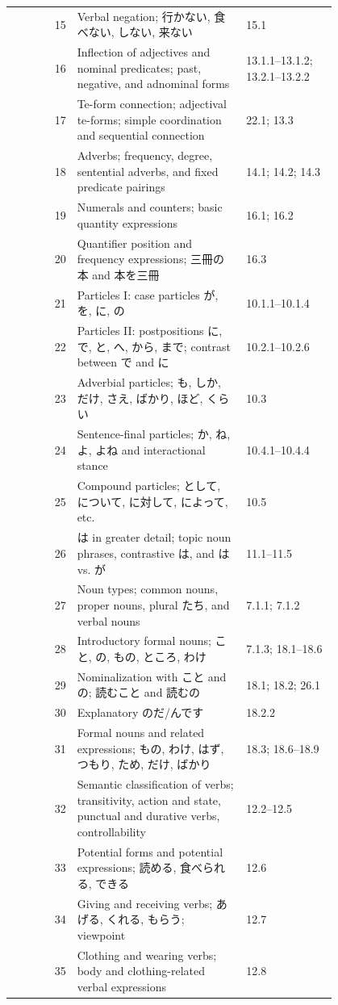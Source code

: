 \documentclass[12pt]{nextbook_zh}
\begin{document}
{\begin{longtable}{r p{0.52\linewidth} p{0.28\linewidth}}
15 & Verbal negation; 行かない, 食べない, しない, 来ない & 15.1 \\
16 & Inflection of adjectives and nominal predicates; past, negative, and adnominal forms & 13.1.1--13.1.2; 13.2.1--13.2.2 \\
17 & Te-form connection; adjectival te-forms; simple coordination and sequential connection & 22.1; 13.3 \\
18 & Adverbs; frequency, degree, sentential adverbs, and fixed predicate pairings & 14.1; 14.2; 14.3 \\
19 & Numerals and counters; basic quantity expressions & 16.1; 16.2 \\
20 & Quantifier position and frequency expressions; 三冊の本 and 本を三冊 & 16.3 \\
21 & Particles I: case particles が, を, に, の & 10.1.1--10.1.4 \\
22 & Particles II: postpositions に, で, と, へ, から, まで; contrast between で and に & 10.2.1--10.2.6 \\
23 & Adverbial particles; も, しか, だけ, さえ, ばかり, ほど, くらい & 10.3 \\
24 & Sentence-final particles; か, ね, よ, よね and interactional stance & 10.4.1--10.4.4 \\
25 & Compound particles; として, について, に対して, によって, etc. & 10.5 \\
26 & は in greater detail; topic noun phrases, contrastive は, and は vs. が & 11.1--11.5 \\
27 & Noun types; common nouns, proper nouns, plural たち, and verbal nouns & 7.1.1; 7.1.2 \\
28 & Introductory formal nouns; こと, の, もの, ところ, わけ & 7.1.3; 18.1--18.6 \\
29 & Nominalization with こと and の; 読むこと and 読むの & 18.1; 18.2; 26.1 \\
30 & Explanatory のだ/んです & 18.2.2 \\
31 & Formal nouns and related expressions; もの, わけ, はず, つもり, ため, だけ, ばかり & 18.3; 18.6--18.9 \\
32 & Semantic classification of verbs; transitivity, action and state, punctual and durative verbs, controllability & 12.2--12.5 \\
33 & Potential forms and potential expressions; 読める, 食べられる, できる & 12.6 \\
34 & Giving and receiving verbs; あげる, くれる, もらう; viewpoint & 12.7 \\
35 & Clothing and wearing verbs; body and clothing-related verbal expressions & 12.8 \\

\end{longtable}}
\end{document}
